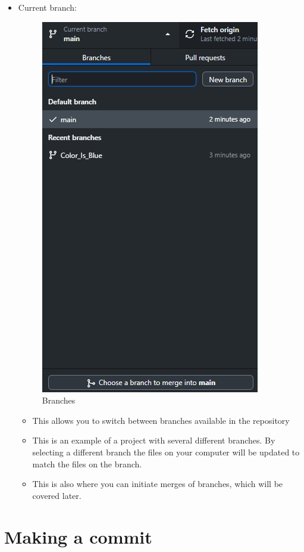 \documentclass{article}
\begin{document}
\begin{itemize}
\begin{itemize}
        \end{itemize}
        \item Current branch:
\begin{figure}
    \centering
    \includegraphics[width=0.5\linewidth]{branches.png}
    \caption{Branches}
\end{figure}
        \begin{itemize}
            \item This allows you to switch between branches available in the repository
            \item This is an example of a project with several different branches. By selecting a different branch the files on your computer will be updated to match the files on the branch.
            \item This is also where you can initiate merges of branches, which will be covered later.
        \end{itemize}
    \end{itemize}

\section{Making a commit}
\end{document}

